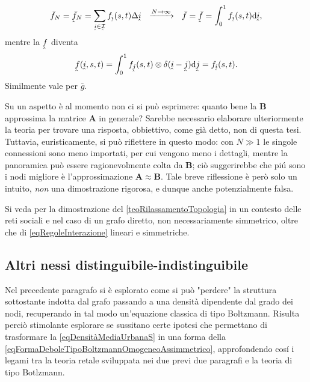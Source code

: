\begin{oss}
                \[
                    \bar f_N=\underhat{\bar f}_N
                    =\sum_{\underhat i\in\underhat{\mathcal I}}f_{\underhat i}(s,t)\Delta\underhat i
                    \ \ \xrightarrow{N\to\infty}\ \ 
                    \bar f=\underhat{\bar f}
                    =\int_0^1f_{\underhat i}(s,t)\de\underhat i,
                \]
                mentre la \(\underhat f\) diventa
                \[
                    \underhat f(\underhat i,s,t)
                    =\int_0^1f_{\underhat j}(s,t)\otimes\delta(\underhat i-\underhat j)\de\underhat j
                    =f_{\underhat i}(s,t).
                \]
                Similmente vale per \(\bar g\).
            \end{oss}

            \begin{oss}
                Su un aspetto è al momento non ci si può esprimere: quanto bene la \(\mathbf B\) approssima la matrice \(\mathbf A\) in generale? Sarebbe necessario elaborare ulteriormente la teoria per trovare una risposta, obbiettivo, come già detto, non di questa tesi. Tuttavia, euristicamente, si può riflettere in questo modo: con \(N\gg1\) le singole connessioni sono meno importati, per cui vengono meno i dettagli, mentre la panoramica può essere ragionevolmente colta da \(\mathbf B\); ciò suggerirebbe che piú sono i nodi migliore è l'approssimazione \(\mathbf A\approx\mathbf B\). Tale breve riflessione è però solo un intuito, \textit{non} una dimostrazione rigorosa, e dunque anche potenzialmente falsa.
            \end{oss}

            \begin{oss}
                Si veda \cite{Nurisso2024} per la dimostrazione del \cref{teoRilassamentoTopologia} in un contesto delle reti sociali e nel caso di un grafo diretto, non necessariamente simmetrico, oltre che di \ref{eqRegoleInterazione} lineari e simmetriche.
            \end{oss}

        \subsection{Altri nessi distinguibile-indistinguibile}\label{secNessiDI}

            Nel precedente paragrafo si è esplorato come si può "perdere" la struttura sottostante indotta dal grafo passando a una densità dipendente dal grado dei nodi, recuperando in tal modo un'equazione classica di tipo Boltzmann. Risulta perciò stimolante esplorare se sussitano certe ipotesi che permettano di trasformare la \ref{eqDensitàMediaUrbanaS} in una forma della \ref{eqFormaDeboleTipoBoltzmannOmogeneoAssimmetrico}, approfondendo cosí i legami tra la teoria retale sviluppata nei due previ due paragrafi e la teoria di tipo Botlzmann.

